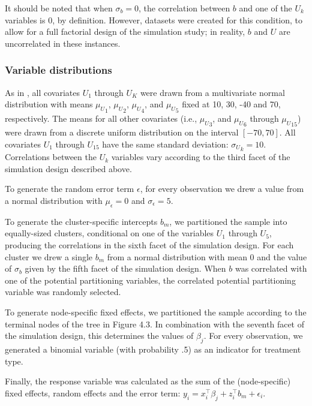 \documentclass[nobf,doc]{apa}
\begin{document}
It should be noted that when $\sigma_b = 0$, the correlation between $b$ and one of the $U_k$ variables is 0, by definition. However, datasets were created for this condition, to allow for a full factorial design of the simulation study; in reality, $b$ and $U$ are uncorrelated in these instances. 



\subsubsection{Variable distributions}

As in , all covariates $U_1$ through $U_{K}$ were drawn from a multivariate normal distribution with means ${\mu_U}_1$, ${\mu_U}_2$, ${\mu_U}_4$, and ${\mu_U}_5$ fixed at 10, 30, -40 and 70, respectively. The means for all other covariates (i.e., ${\mu_U}_3$, and ${\mu_U}_6$ through ${\mu_U}_{15}$) were drawn from a discrete uniform distribution on the interval $[-70,70]$. All covariates $U_1$ through $U_{15}$ have the same standard deviation: ${\sigma_U}_k = 10$. Correlations between the $U_k$ variables vary according to the third facet of the simulation design described above.

To generate the random error term $\epsilon$, for every observation we drew a value from a normal distribution with $\mu_{\epsilon} = 0$ and $\sigma_{\epsilon} = 5$. 

To generate the cluster-specific intercepts $b_m$, we partitioned the sample into equally-sized clusters, conditional on one of the variables $U_1$ through $U_5$, producing the correlations in the sixth facet of the simulation design. For each cluster we drew a single $b_m$ from a normal distribution with mean 0 and the value of $\sigma_{b}$ given by the fifth facet of the simulation design. When $b$ was correlated with one of the potential partitioning variables, the correlated potential partitioning variable was randomly selected.

To generate node-specific fixed effects, we partitioned the sample according to the terminal nodes of the tree in Figure 4.3. In combination with the seventh facet of the simulation design, this determines the values of $\beta_j$. For every observation, we generated a binomial variable (with probability .5) as an indicator for treatment type. 

Finally, the response variable was calculated as the sum of the (node-specific) fixed effects, random effects and the error term: $y_{i} = x_{i}^{\top} \beta_{j} + z_{i}^{\top} b_{m} + \epsilon_{i}$.
\end{document}
